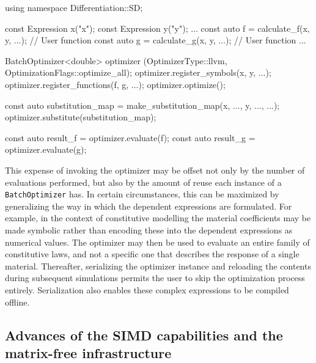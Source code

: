 \documentclass{ansarticle-preprint}
\begin{document}
\begin{c++}
using namespace Differentiation::SD;

const Expression x("x");
const Expression y("y");
...
const auto f = calculate_f(x, y, ...); // User function
const auto g = calculate_g(x, y, ...); // User function
...

BatchOptimizer<double> optimizer (OptimizerType::llvm,
                                  OptimizationFlags::optimize_all);
optimizer.register_symbols(x, y, ...);
optimizer.register_functions(f, g, ...);
optimizer.optimize();

const auto substitution_map
  = make_substitution_map({x, ...}, {y, ...}, ...);
optimizer.substitute(substitution_map);

const auto result_f = optimizer.evaluate(f);
const auto result_g = optimizer.evaluate(g);
\end{c++}

This expense of invoking the optimizer may be offset not only by
the number of evaluations performed, but also by the amount of reuse each
instance of a \texttt{BatchOptimizer} has.
In certain circumstances, this can be maximized by generalizing the way in which
the dependent expressions are formulated.
For example, in the context of constitutive modelling the material coefficients
may be made symbolic rather than encoding these into the dependent expressions
as numerical values.
The optimizer may then be used to evaluate an entire family of constitutive laws,
and not a specific one that describes the response of a single material.
Thereafter, serializing the optimizer instance and reloading the contents during
subsequent simulations permits the user to skip the optimization process entirely.
Serialization also enables these complex expressions to be compiled offline.

\subsection{Advances of the SIMD capabilities and the matrix-free infrastructure}
\label{subsec:mf}

\end{document}
